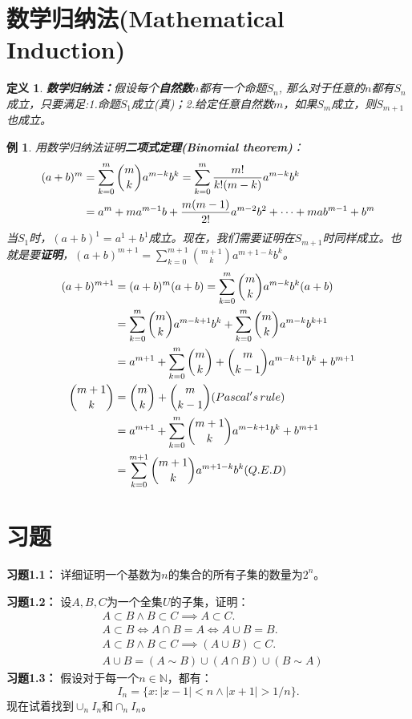 \documentclass[mathserif,hyperref,UTF8,openany,b5paper]{ctexbook}
\newtheorem{exmp}{例}[section]
\newtheorem{defn}{定义}[section]
\begin{document}
\section{数学归纳法(Mathematical Induction)}
\begin{defn}
\textbf{数学归纳法：}假设每个\textbf{自然数}$n$都有一个命题$S_n$, 那么对于任意的$n$都有$S_n$成立，只要满足:1.命题$S_1$成立(真)；2.给定任意自然数$m$，如果$S_m$成立，则$S_{m+1}$也成立。
\end{defn}
\begin{exmp}
用数学归纳法证明\textbf{二项式定理(Binomial theorem)}：
\begin{align}
  (a+b)^ {m} &= \sum _ {k=0}^ {m} \binom{m}{k}a^ {m-k} b^ {k}  =  \sum _ {k=0}^ {m}  \frac {m!}{k!(m-k)} a^ {m-k} b^ {k} \\
&=  a^ {m}  + ma^ {m-1}  b+  \frac {m(m-1)}{2!} a^ {m-2}  b^ {2}  +  \cdots +  mab^ {m-1}  + b^ {m}\notag 
\end{align}当$S_1$时，$(a+b)^1=a^1+b^1$成立。现在，我们需要证明在$S_{m+1}$时同样成立。也就是要\textbf{证明}，$(a+b)^ {m+1} = \sum _ {k=0}^ {m+1} \binom{m+1}{k}a^ {m+1-k} b^ {k}$。
\begin{align}
(a+b)^ {m+1} &= (a+b)^ {m} (a+b) = \sum _ {k=0}^ {m} \binom{m}{k}a^ {m-k} b^ {k} (a+b)\\
&=\sum _ {k=0}^ {m} \binom{m}{k}a^ {m-k+1} b^ {k} + \sum _ {k=0}^ {m} \binom{m}{k}a^ {m-k} b^ {k+1}\\
&=a^{m+1}+\sum _ {k=0}^ {m} \binom{m}{k} + \binom{m}{k-1} a^ {m-k+1} b^ {k} + b^{m+1} \notag\\
\binom{m+1}{k} &= \binom{m}{k} + \binom{m}{k-1} (Pascal's \, rule) \\
&=a^{m+1}+\sum _ {k=0}^ {m} \binom{m+1}{k} a^ {m-k+1} b^ {k} + b^{m+1} \notag \\ 
&= \sum _ {k=0}^ {m+1} \binom{m+1}{k}a^ {m+1-k} b^ {k} (Q.E.D)
\end{align}
\end{exmp}
\section{习题}
\textbf{习题1.1：}
详细证明一个基数为$n$的集合的所有子集的数量为$2^n$。

\textbf{习题1.2：}
设$A,B,C$为一个全集$U$的子集，证明：\\\textbf{}
\begin{align}
&A\subset B \land B \subset C \implies A\subset C.\\
&A\subset B\Leftrightarrow A \cap B=A\Leftrightarrow A\cup B=B.\\
&A\subset B \land B \subset C \implies (A\cup B)\subset C.\\
&A\cup B= (A\sim B)\cup(A\cap B)\cup(B\sim A)
\end{align} 
\textbf{习题1.3：}
假设对于每一个$n\in \mathbb{N}$，都有：
\begin{equation}
    I_n=\{x:|x-1|<n \land |x+1|>1/n\}.
\end{equation}
现在试着找到$\cup_n I_n$和$\cap_n I_n$。
\end{document}

